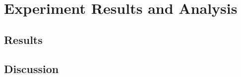 \chapter{Experiment Results and Analysis}
\label{chapter:results-and-analysis}

\section{Results}
\label{sec:results}


\section{Discussion}
\label{sec:discussion}


